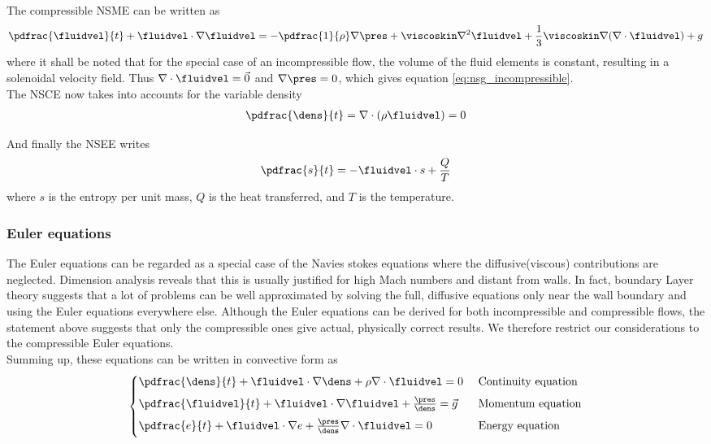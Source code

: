 \documentclass[../main.tex]{subfiles}
\begin{document}
The compressible \ac{NSME} can be written as
\begin{align}\label{eq:nsg_compressible}
\pdfrac{\fluidvel}{t} +
\fluidvel\cdot\nabla\fluidvel =
-\pdfrac{1}{\rho}\nabla\pres +
\viscoskin\nabla^2\fluidvel +
\frac{1}{3} \viscoskin\nabla(\nabla\cdot\fluidvel) +
g
\end{align}
where it shall be noted that for the special case of an incompressible flow, the volume of the fluid elements is constant, resulting in a solenoidal velocity field. Thus $\nabla\cdot\fluidvel=\vec{0}$ and $\nabla\pres=0$, which gives equation \ref{eq:nsg_incompressible}.
\\
The \ac{NSCE} now takes into accounts for the variable density
\begin{align}
\pdfrac{\dens}{t}=\nabla\cdot(\rho\fluidvel)=0
\end{align}

And finally the \ac{NSEE} writes
\begin{align}
\pdfrac{s}{t}=-\fluidvel\cdot s + \frac{Q}{T}
\end{align}
where $s$ is the entropy per unit mass, $Q$ is the heat transferred, and $T$ is the temperature.


\subsubsection{Euler equations}\label{sec:euler_convective}
The Euler equations can be regarded as a special case of the Navies stokes equations where the diffusive(viscous) contributions are neglected. Dimension analysis \cite{Doering1995} reveals that this is usually justified for high Mach numbers and distant from walls. In fact, boundary Layer theory suggests that a lot of problems can be well approximated by solving the full, diffusive equations only near the wall boundary and using the Euler equations everywhere else.
Although the Euler equations can be derived for both incompressible and compressible flows, the statement above suggests that only the compressible ones give actual, physically correct results. We therefore restrict our considerations to the compressible Euler equations.\\
Summing up, these equations can be written in convective form as
\begin{align}
\begin{cases}
\pdfrac{\dens}{t}+\fluidvel\cdot\nabla\dens+\rho\nabla\cdot\fluidvel = 0           &\text{ Continuity equation} \\[0.5em]
\pdfrac{\fluidvel}{t}+\fluidvel\cdot\nabla\fluidvel+\frac{\pres}{\dens} = \vec{g}  &\text{ Momentum equation} \\[0.5em]
\pdfrac{e}{t}+\fluidvel\cdot\nabla e + \frac{\pres}{\dens}\nabla\cdot\fluidvel = 0 &\text{ Energy equation} \\[0.5em]
\end{cases}
\end{align}
\end{document}
